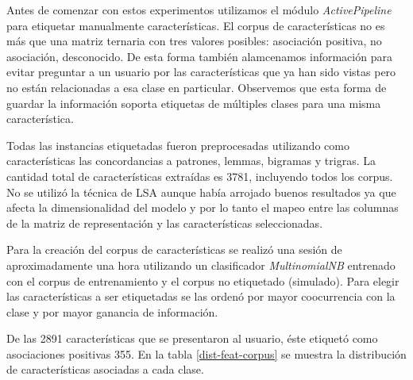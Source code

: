 
Antes de comenzar con estos experimentos utilizamos el módulo \textit{ActivePipeline} para etiquetar manualmente características. El corpus de características no es más que una matriz ternaria con tres valores posibles: asociación positiva, no asociación, desconocido. De esta forma también alamcenamos información para evitar preguntar a un usuario por las características que ya han sido vistas pero no están relacionadas a esa clase en particular. Observemos que esta forma de guardar la información soporta etiquetas de múltiples clases para una misma característica.

Todas las instancias etiquetadas fueron preprocesadas utilizando como características las concordancias a patrones, lemmas, bigramas y trigras. La cantidad total de características extraídas es 3781, incluyendo todos los corpus. No se utilizó la técnica de LSA aunque había arrojado buenos resultados ya que afecta la dimensionalidad del modelo y por lo tanto el mapeo entre las columnas de la matriz de representación y las características seleccionadas.

Para la creación del corpus de características se realizó una sesión de aproximadamente una hora utilizando un clasificador \textit{MultinomialNB} entrenado con el corpus de entrenamiento y el corpus no etiquetado (simulado). Para elegir las características a ser etiquetadas se las ordenó por mayor coocurrencia con la clase y por mayor ganancia de información.

De las 2891 características que se presentaron al usuario, éste etiquetó como asociaciones positivas 355. En la tabla \ref{dist-feat-corpus} se muestra la distribución de características asociadas a cada clase.

